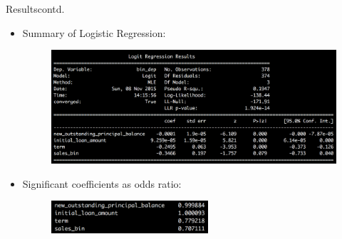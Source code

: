 \documentclass{beamer}
\begin{document}
\begin{frame}{Results}{contd.}
	\vspace{-0.25in}
	\begin{itemize}
		\item{Summary of Logistic Regression:} \newline
		\begin{figure}
		\vspace{-0.1 in}
			\begin{center}
					\vspace*{-0.3 in}
					\hspace*{-0.2in}
					\includegraphics[width=1\textwidth]{log_reg_results.png} 
				\end{center}
		\end{figure}
		\item{Significant coefficients as odds ratio:} \newline\vspace{-0 in}		
		\begin{figure}
			\begin{center}
				\vspace*{-0.2in}
				\hspace*{-2in}
				\includegraphics[width=0.55\textwidth]{odds_ratio.png} 
				\end{center}
		\end{figure}
	\end{itemize}
\end{frame}
\end{document}
